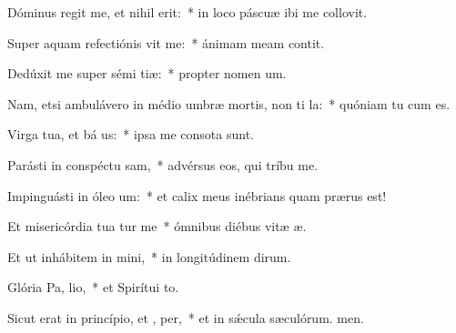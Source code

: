 \item Dóminus regit me, et nihil  erit:~* in loco páscuæ ibi me collovit.
\item Super aquam refectiónis vit me:~* ánimam meam contit.
\item Dedúxit me super sémi tiæ:~* propter nomen um.
\item Nam, etsi ambulávero in médio umbræ mortis, non ti la:~* quóniam tu cum es.
\item Virga tua, et bá us:~* ipsa me consota sunt.
\item Parásti in conspéctu  sam,~* advérsus eos, qui tríbu me.
\item Impinguásti in óleo  um:~* et calix meus inébrians quam prærus est!
\item Et misericórdia tua tur me~* ómnibus diébus vitæ æ.
\item Et ut inhábitem in  mini,~* in longitúdinem dirum.
\item Glória Pa,  lio,~* et Spirítui to.
\item Sicut erat in princípio, et ,  per,~* et in sǽcula sæculórum. men.
